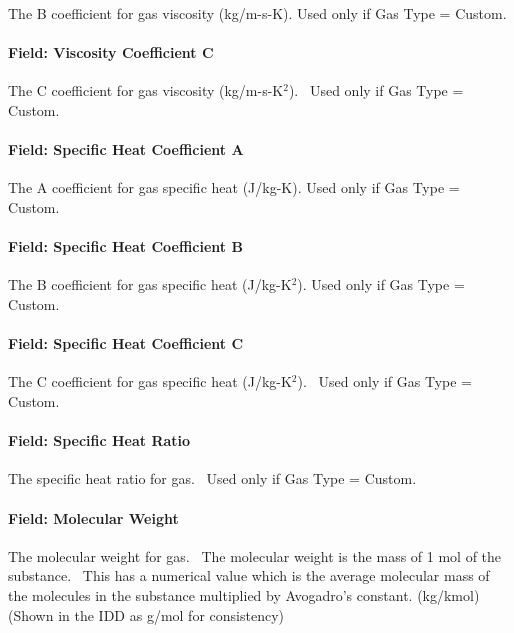 The B coefficient for gas viscosity (kg/m-s-K). Used only if Gas Type = Custom.

\paragraph{Field: Viscosity Coefficient C}\label{field-viscosity-coefficient-c-1}

The C coefficient for gas viscosity (kg/m-s-K\(^{2}\)).~ Used only if Gas Type = Custom.

\paragraph{Field: Specific Heat Coefficient A}\label{field-specific-heat-coefficient-a-1}

The A coefficient for gas specific heat (J/kg-K). Used only if Gas Type = Custom.

\paragraph{Field: Specific Heat Coefficient B}\label{field-specific-heat-coefficient-b-1}

The B coefficient for gas specific heat (J/kg-K\(^{2}\)). Used only if Gas Type = Custom.

\paragraph{Field: Specific Heat Coefficient C}\label{field-specific-heat-coefficient-c-1}

The C coefficient for gas specific heat (J/kg-K\(^{2}\)).~ Used only if Gas Type = Custom.

\paragraph{Field: Specific Heat Ratio}\label{field-specific-heat-ratio-2}

The specific heat ratio for gas.~ Used only if Gas Type = Custom.

\paragraph{Field: Molecular Weight}\label{field-molecular-weight-1}

The molecular weight for gas.~ The molecular weight is the mass of 1 mol of the substance.~ This has a numerical value which is the average molecular mass of the molecules in the substance multiplied by Avogadro's constant. (kg/kmol) (Shown in the IDD as g/mol for consistency)

